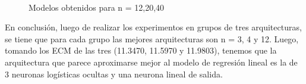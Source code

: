 \documentclass[a4paper]{article}
\begin{document}
	\begin{figure}[H]
	\centering
	\\
	\caption{Modelos obtenidos para n = 12,20,40}
	\label{f:aprox12-20-40}
	\end{figure}
	
En conclusión, luego de realizar los experimentos en grupos de tres arquitecturas, se tiene que para cada grupo las mejores arquitecturas son n = 3, 4 y 12. Luego, tomando los ECM de las tres (11.3470, 11.5970 y 11.9803), tenemos que la arquitectura que parece aproximarse mejor al modelo de regresión lineal es la de 3 neuronas logísticas ocultas y una neurona lineal de salida.
\end{document}
